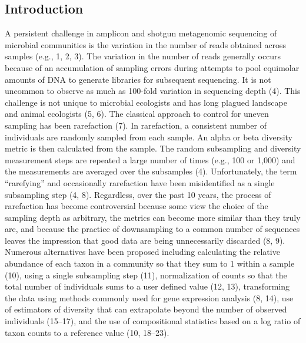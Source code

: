 \documentclass[
  11pt,
]{article}
\begin{document}
\newpage{}

\subsection{Introduction}\label{introduction}

A persistent challenge in amplicon and shotgun metagenomic sequencing of
microbial communities is the variation in the number of reads obtained
across samples (e.g., 1, 2, 3). The variation in the number of reads
generally occurs because of an accumulation of sampling errors during
attempts to pool equimolar amounts of DNA to generate libraries for
subsequent sequencing. It is not uncommon to observe as much as 100-fold
variation in sequencing depth (4). This challenge is not unique to
microbial ecologists and has long plagued landscape and animal
ecologists (5, 6). The classical approach to control for uneven sampling
has been rarefaction (7). In rarefaction, a consistent number of
individuals are randomly sampled from each sample. An alpha or beta
diversity metric is then calculated from the sample. The random
subsampling and diversity measurement steps are repeated a large number
of times (e.g., 100 or 1,000) and the measurements are averaged over the
subsamples (4). Unfortunately, the term ``rarefying'' and occasionally
rarefaction have been misidentified as a single subsampling step (4, 8).
Regardless, over the past 10 years, the process of rarefaction has
become controversial because some view the choice of the sampling depth
as arbitrary, the metrics can become more similar than they truly are,
and because the practice of downsampling to a common number of sequences
leaves the impression that good data are being unnecessarily discarded
(8, 9). Numerous alternatives have been proposed including calculating
the relative abundance of each taxon in a community so that they sum to
1 within a sample (10), using a single subsampling step (11),
normalization of counts so that the total number of individuals sums to
a user defined value (12, 13), transforming the data using methods
commonly used for gene expression analysis (8, 14), use of estimators of
diversity that can extrapolate beyond the number of observed individuals
(15--17), and the use of compositional statistics based on a log ratio
of taxon counts to a reference value (10, 18--23).
\end{document}
